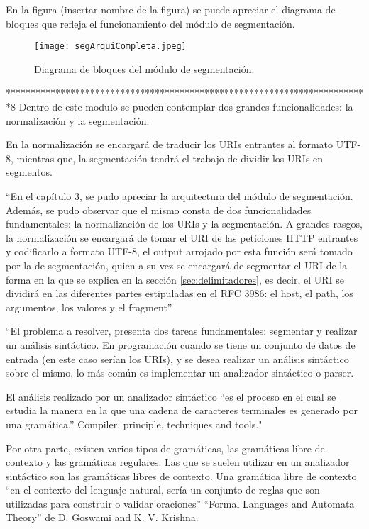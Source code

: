 En la figura (insertar nombre de la figura) se puede apreciar el diagrama de bloques que refleja el funcionamiento del módulo de segmentación.

\begin{figure}[tb]
\begin{center}
\texttt{[image: segArquiCompleta.jpeg]}
\caption{Diagrama de bloques del módulo de segmentación.}
\label{fig:modoSistema}
\end{center}
\end{figure}

*************************************************************************8
Dentro de este modulo se pueden contemplar dos grandes funcionalidades: la normalización y la segmentación.

En la normalización se encargará de traducir los URIs entrantes al formato UTF-8, mientras que, la segmentación tendrá el trabajo de dividir los URIs en segmentos. 

``En el capítulo 3, se pudo apreciar la arquitectura del módulo de segmentación. Además, se pudo observar que el mismo consta de dos funcionalidades fundamentales: la normalización de los URIs y la segmentación. A grandes rasgos, la normalización se encargará de tomar el URI de las peticiones HTTP entrantes y codificarlo a formato UTF-8, el output arrojado por esta función será tomado por la de segmentación, quien a su vez se encargará de segmentar el URI de la forma en la que se explica en la sección \ref{sec:delimitadores}, es decir, el URI se dividirá en las diferentes partes estipuladas en el RFC 3986: el host, el path, los argumentos, los valores y el fragment''

``El problema a resolver, presenta dos tareas fundamentales: segmentar y realizar un análisis sintáctico. En programación cuando se tiene un conjunto de datos de entrada (en este caso serían los URIs), y se desea realizar un análisis sintáctico sobre el mismo, lo más común es implementar un analizador sintáctico o parser.

El análisis realizado por un analizador sintáctico “es el proceso en el cual se estudia la manera en la que una cadena de caracteres terminales es generado por una gramática.”  Compiler, principle, techniques and tools."

Por otra parte, existen varios tipos de gramáticas, las gramáticas libre de contexto y las gramáticas regulares. Las que se suelen utilizar en un analizador sintáctico son las gramáticas libres de contexto. Una gramática libre de contexto “en el contexto del lenguaje natural, sería un conjunto de reglas que son utilizadas para construir o validar oraciones” “Formal Languages and Automata Theory” de D. Goswami and K. V. Krishna. 

